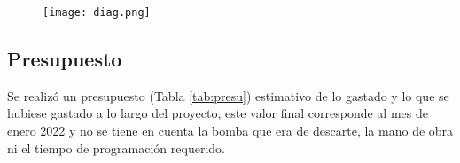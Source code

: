 \begin{figure}[htb]
	\centering
	\texttt{[image: diag.png]}
	\label{fig:diag}
\end{figure}

\subsection{Presupuesto}

Se realizó un presupuesto (Tabla \ref{tab:presu}) estimativo de lo gastado y lo que se hubiese gastado a lo largo del proyecto, este valor final corresponde al mes de enero 2022 y no se tiene en cuenta la bomba que era de descarte, la mano de obra ni el tiempo de programación requerido.
